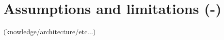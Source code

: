 \section{Assumptions and limitations (-)}
\label{sec:assumptions-limitations}
(knowledge/architecture/etc...)
